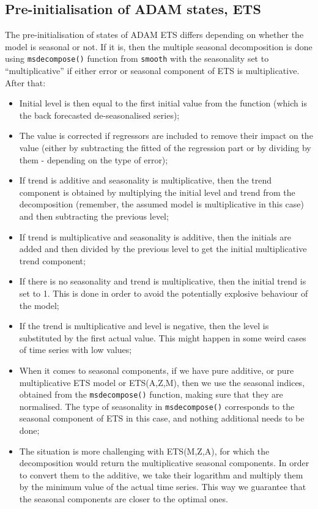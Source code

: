 \documentclass[
]{book}
\providecommand{\tightlist}{%
  \setlength{\itemsep}{0pt}\setlength{\parskip}{0pt}}
\theoremstyle{definition}
\theoremstyle{definition}
\theoremstyle{definition}
\theoremstyle{definition}
\theoremstyle{remark}
\begin{document}
\hypertarget{pre-initialisation-of-adam-states-ets}{%
\subsection{Pre-initialisation of ADAM states, ETS}\label{pre-initialisation-of-adam-states-ets}}

The pre-initialisation of states of ADAM ETS differs depending on whether the model is seasonal or not. If it is, then the multiple seasonal decomposition is done using \texttt{msdecompose()} function from \texttt{smooth} with the seasonality set to ``multiplicative'' if either error or seasonal component of ETS is multiplicative. After that:

\begin{itemize}
\tightlist
\item
  Initial level is then equal to the first initial value from the function (which is the back forecasted de-seasonalised series);
\item
  The value is corrected if regressors are included to remove their impact on the value (either by subtracting the fitted of the regression part or by dividing by them - depending on the type of error);
\item
  If trend is additive and seasonality is multiplicative, then the trend component is obtained by multiplying the initial level and trend from the decomposition (remember, the assumed model is multiplicative in this case) and then subtracting the previous level;
\item
  If trend is multiplicative and seasonality is additive, then the initials are added and then divided by the previous level to get the initial multiplicative trend component;
\item
  If there is no seasonality and trend is multiplicative, then the initial trend is set to 1. This is done in order to avoid the potentially explosive behaviour of the model;
\item
  If the trend is multiplicative and level is negative, then the level is substituted by the first actual value. This might happen in some weird cases of time series with low values;
\item
  When it comes to seasonal components, if we have pure additive, or pure multiplicative ETS model or ETS(A,Z,M), then we use the seasonal indices, obtained from the \texttt{msdecompose()} function, making sure that they are normalised. The type of seasonality in \texttt{msdecompose()} corresponds to the seasonal component of ETS in this case, and nothing additional needs to be done;
\item
  The situation is more challenging with ETS(M,Z,A), for which the decomposition would return the multiplicative seasonal components. In order to convert them to the additive, we take their logarithm and multiply them by the minimum value of the actual time series. This way we guarantee that the seasonal components are closer to the optimal ones.
\end{itemize}
\end{document}
